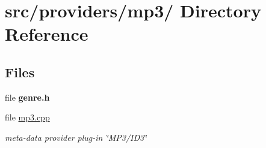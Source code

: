 \hypertarget{dir_000025}{
\section{src/providers/mp3/ Directory Reference}
\label{dir_000025}
}
\subsection*{Files}
\begin{CompactItemize}
\item 
file {\bf genre.h}
\item 
file \hyperlink{mp3_8cpp}{mp3.cpp}
\begin{CompactList}\small\item\em meta-data provider plug-in \char`\"{}MP3/ID3\char`\"{} \item\end{CompactList}

\end{CompactItemize}
